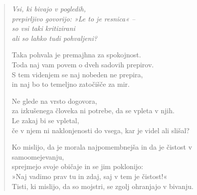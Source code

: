 \begin{verse}


\emph{Vsi, ki bivajo v pogledih,}\\
\emph{prepirljivo govorijo: »Le to je resnica« --}\\
\emph{so vsi taki kritizirani}\\
\emph{ali so lahko tudi pohvaljeni?}

Taka pohvala je premajhna za spokojnost.\\
Toda naj vam povem o dveh sadovih prepirov.\\
S tem videnjem se naj nobeden ne prepira,\\
in naj bo to temeljno zatočišče za mir.

Ne glede na vrsto dogovora,\\
za izkušenega človeka ni potrebe, da se vpleta v njih.\\
Le zakaj bi se vpletal,\\
če v njem ni naklonjenosti do vsega, kar je videl ali slišal?

Ko mislijo, da je morala najpomembnejša in da je čistost v samoomejevanju,\\
sprejmejo svoje običaje in se jim poklonijo:\\
»Naj vadimo prav tu in zdaj, saj v tem je čistost!«\\
Tisti, ki mislijo, da so mojstri, se zgolj ohranjajo v bivanju.

\end{verse}


